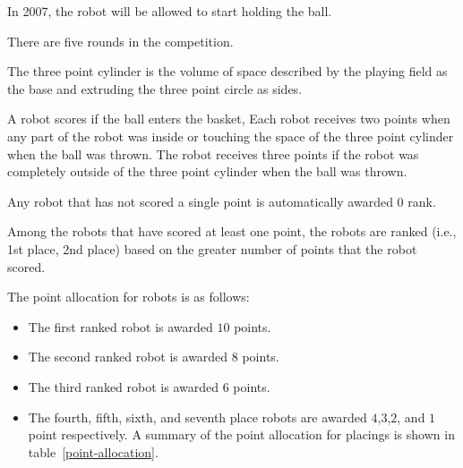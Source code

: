 \documentclass[12pt]{hurocup}
\begin{document}
\begin{decisions}
\item In 2007, the robot will be allowed to start holding the ball.
\end{decisions}

\label{basketball-scoring}

\begin{lawlist}[BB]

\item There are five rounds in the competition.

\item The three point cylinder is the volume of space described by the
 playing field as the base and extruding the three point circle
 as sides. 

\item A robot scores if the ball enters the basket, Each robot
 receives two points when any part of the robot was inside or touching
 the space of the three point cylinder when the ball was thrown. The
 robot receives three points if the robot was completely outside of
 the three point cylinder when the ball was thrown.

\item Any robot that has not scored a single point is automatically
  awarded 0 rank.

\item Among the robots that have scored at least one point, the robots
  are ranked (i.e., 1st place, 2nd place) based on the greater number
  of points that the robot scored.

\item The point allocation for robots is as follows:
  \begin{itemize}
  \item The first ranked robot is awarded $10$ points.
  \item The second ranked robot is awarded $8$ points.
  \item The third ranked robot is awarded $6$ points.
  \item The fourth, fifth, sixth, and seventh place robots are awarded
    $4$,$3$,$2$, and $1$ point respectively.  A summary of the point
    allocation for placings is shown in table~\ref{point-allocation}.


\end{itemize}
\end{lawlist}
\end{document}
